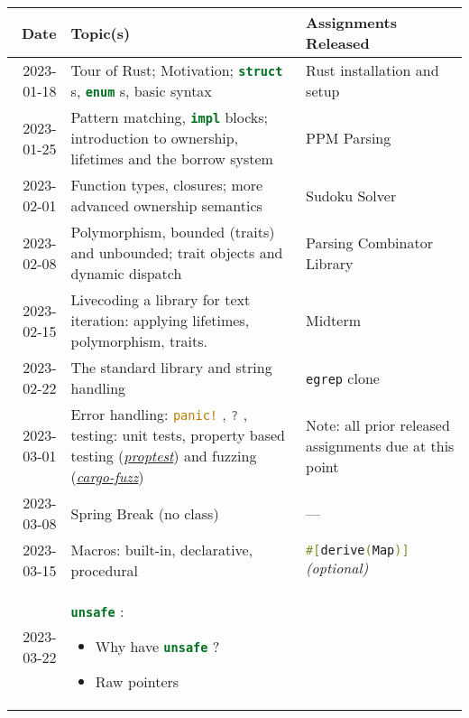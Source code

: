 \documentclass{article}
\newcommand{\code}[2][]{{\sloppy
\ifmmode
\text{\lstinline[language=rust,#1]`#2`}
\else
{\lstinline[language=rust,#1]`#2`}%
\fi}}
\begin{document}
\begin{longtable}{rp{}@{\hskip .05\textwidth}p{}}
    Date        & Topic(s)                          & Assignments Released  \\
    \toprule
    2023-01-18  & Tour of Rust; Motivation;
                  \code{struct}s, \code{enum}s, basic syntax
                & Rust installation and setup                               \\
    2023-01-25  & Pattern matching, \code{impl} blocks; introduction to
                  ownership, lifetimes and the borrow system
                & PPM Parsing                                               \\
    2023-02-01  & Function types, closures; more advanced ownership semantics
                & Sudoku Solver                                             \\
    2023-02-08  & Polymorphism, bounded (traits) and unbounded; trait objects
                  and dynamic dispatch
                & Parsing Combinator Library                                \\
    2023-02-15  & Livecoding a library for text iteration: applying lifetimes,
                  polymorphism, traits.
                & Midterm                                                   \\
    2023-02-22  & The standard library and string handling
                & \texttt{egrep} clone                                      \\
    2023-03-01  & Error handling: \code{panic!}, \code{?}, testing: unit tests,
                  property based testing
                  (\href{https://github.com/AltSysrq/proptest}{\textit{proptest}})
                  and fuzzing
                  (\href{https://github.com/rust-fuzz/cargo-fuzz}{\textit{cargo-fuzz}})
                & Note: all prior released assignments due at this point    \\
    2023-03-08  & Spring Break (no class)
                & ---                                                       \\
    2023-03-15  & Macros: built-in, declarative, procedural
                & \code{#[derive(Map)]} \textit{(optional)}                 \\
    2023-03-22  & \code{unsafe}: \begin{itemize}
                        \item Why have \code{unsafe}?
                        \item Raw pointers

\end{itemize}
\end{longtable}
\end{document}
